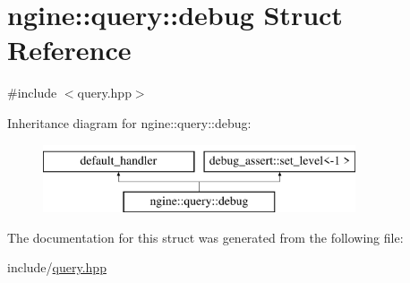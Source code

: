 \hypertarget{structngine_1_1query_1_1debug}{}\section{ngine\+:\+:query\+:\+:debug Struct Reference}
\label{structngine_1_1query_1_1debug}


{\ttfamily \#include $<$query.\+hpp$>$}

Inheritance diagram for ngine\+:\+:query\+:\+:debug\+:\begin{figure}[H]
\begin{center}
\leavevmode
\includegraphics[height=2.000000cm]{structngine_1_1query_1_1debug}
\end{center}
\end{figure}


The documentation for this struct was generated from the following file\+:\begin{DoxyCompactItemize}
\item 
include/\hyperlink{query_8hpp}{query.\+hpp}\end{DoxyCompactItemize}
